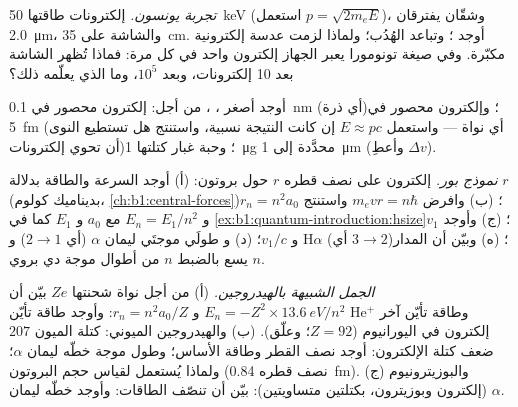 \begin{exercise}[$\star\star$]\label{exo:b1:quantum-introduction:7}
\emph{تجربة يونسون.} إلكترونات طاقتها \qty{50}{keV} (استعمل $p =
\sqrt{2m_eE}$)، وشقّان يفترقان \qty{2.0}{\micro m}، والشاشة على
\qty{35}{cm}. أوجد ؛ وتباعد الهُدُب؛ ولماذا لزمت عدسة إلكترونية
مكبّرة. وفي صيغة تونومورا يعبر الجهاز إلكترون واحد في كل مرة:
فماذا تُظهر الشاشة بعد 10 إلكترونات، وبعد $10^5$،
وما الذي يعلّمه ذلك؟
\end{exercise}

\begin{exercise}[$\star\star$]\label{exo:b1:quantum-introduction:8}
أوجد أصغر ، ، من أجل: إلكترون
محصور في \qty{0.1}{nm} (أي ذرة)؛ وإلكترون محصور في
\qty{5}{fm} (أي نواة --- واستعمل $E \approx pc$ إن كانت النتيجة
نسبية، واستنتج هل تستطيع النوى أن تحوي إلكترونات)؛ وحبة
غبار كتلتها \qty{1}{\micro g} محدَّدة إلى \qty{1}{\micro m} (وأعطِ $\Delta v$).
\end{exercise}

\begin{exercise}[$\star\star$]\label{exo:b1:quantum-introduction:9}
\emph{نموذج بور.} إلكترون على  نصف قطره $r$ حول
بروتون: (أ) أوجد السرعة والطاقة بدلالة $r$ (بديناميك كولوم،
\cref{ch:b1:central-forces})؛ (ب) وافرض $m_evr = n\hbar$ واستنتج
$r_n = n^2a_0$ و $E_n = E_1/n^2$ مع $a_0$ و $E_1$ كما في
\cref{ex:b1:quantum-introduction:hsize}؛ (ج) وأوجد $v_1$ و $v_1/c$؛ (د) و
طولَي موجتَي ليمان $\alpha$ (أي $2 \to 1$) و H$\alpha$ (أي $3 \to 2$)؛
(ه) وبيّن أن المدار $n$ يسع بالضبط $n$ من أطوال موجة دي بروي.
\end{exercise}

\begin{exercise}[$\star\star\star$]\label{exo:b1:quantum-introduction:10}
\emph{الجمل الشبيهة بالهيدروجين.} (أ) من أجل نواة شحنتها $Ze$ بيّن أن
$E_n = -Z^2 \times \qty{13.6}{eV}/n^2$ و $r_n = n^2a_0/Z$: وأوجد طاقة تأيّن
He$^+$ وطاقة تأيّن آخر إلكترون في اليورانيوم ($Z = 92$؛ وعلّق).
(ب) والهيدروجين الميوني: كتلة الميون $207$ ضعف كتلة الإلكترون:
أوجد نصف القطر وطاقة الأساس؛ وطول موجة خطّه ليمان $\alpha$؛ ولماذا
يُستعمل لقياس حجم البروتون (نصف قطره \qty{0.84}{fm}).
(ج) والبوزيترونيوم (إلكترون وبوزيترون، بكتلتين متساويتين): بيّن أن
 تنصّف الطاقات: وأوجد خطّه ليمان $\alpha$.
\end{exercise}

